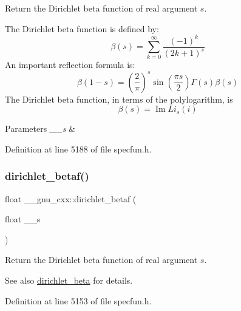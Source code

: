 Return the Dirichlet beta function of real argument $ s $.

The Dirichlet beta function is defined by\+: \[ \beta(s) = \sum_{k=0}^\infty \frac{(-1)^k}{(2k+1)^s} \] An important reflection formula is\+: \[ \beta(1-s) = \left( \frac{2}{\pi}\right)^s \sin(\frac{\pi s}{2}) \Gamma(s) \beta(s) \] The Dirichlet beta function, in terms of the polylogarithm, is \[ \renewcommand\Re{\operatorname{Re}} \renewcommand\Im{\operatorname{Im}} \beta(s) = \Im{Li_s(i)} \]


\begin{DoxyParams}{Parameters}
{\em \+\_\+\+\_\+s} & \\
\hline
\end{DoxyParams}


Definition at line 5188 of file specfun.\+h.

\mbox{\label{group__gnu__math__spec__func_ga9bb40e20b18e3eb822e70af955940830}} 
\subsubsection{\texorpdfstring{dirichlet\+\_\+betaf()}{dirichlet\_betaf()}}
{\footnotesize\ttfamily float \+\_\+\+\_\+gnu\+\_\+cxx\+::dirichlet\+\_\+betaf (\begin{DoxyParamCaption}\item[{float}]{\+\_\+\+\_\+s }\end{DoxyParamCaption})\hspace{0.3cm}{\ttfamily [inline]}}

Return the Dirichlet beta function of real argument $ s $.

\begin{DoxySeeAlso}{See also}
\hyperlink{group__gnu__math__spec__func_ga87466a2d429a2815d794acc21c882b08}{dirichlet\+\_\+beta} for details. 
\end{DoxySeeAlso}


Definition at line 5153 of file specfun.\+h.

\mbox{\label{group__gnu__math__spec__func_gaed6fd85a4577f4de66d74742a1850a13}} 
